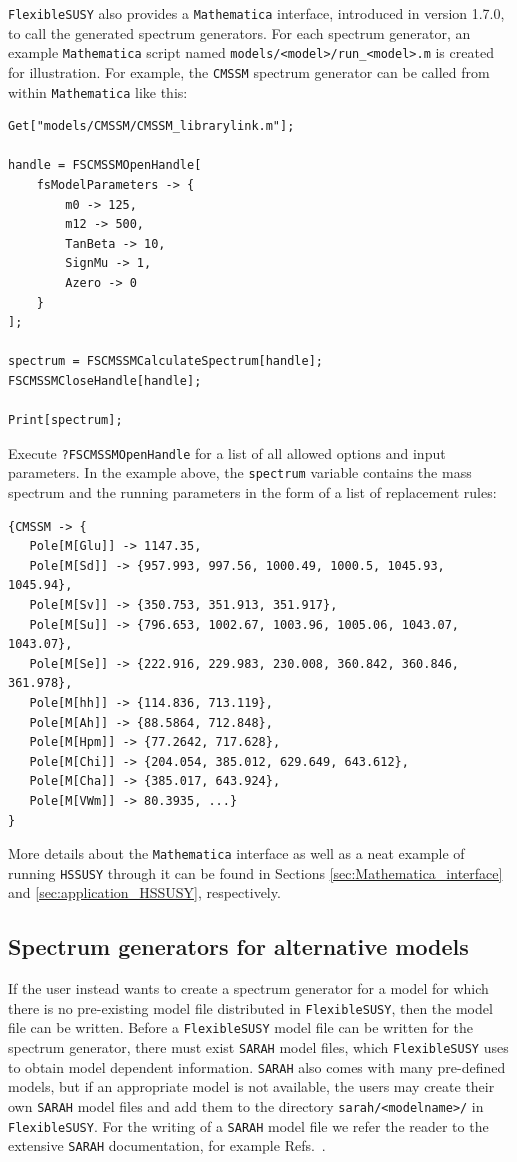 \documentclass[final,3p,11pt,pdflatex]{elsarticle}
\makeatletter
\newcommand{\modelname}[1]{\texttt{#1}\@\xspace}
\newcommand{\sarah}{\texttt{SARAH}\@\xspace}
\newcommand{\fs}{\texttt{FlexibleSUSY}\@\xspace}
\newcommand{\HSSUSY}{\modelname{HSSUSY}}
\newcommand{\mathematica}{\texttt{Ma\-the\-ma\-ti\-ca}\xspace}
\newcommand{\code}[1]{\lstinline|#1|}  %
\makeatother
\begin{document}
\fs also provides a \mathematica interface, introduced in version 1.7.0,
to call the generated spectrum generators.  For each spectrum
generator, an example \mathematica script named
\code{models/<model>/run_<model>.m} is created for illustration.  For
example, the \modelname{CMSSM} spectrum generator can be called from within
\mathematica like this:
%
\begin{lstlisting}
Get["models/CMSSM/CMSSM_librarylink.m"];

handle = FSCMSSMOpenHandle[
    fsModelParameters -> {
        m0 -> 125,
        m12 -> 500,
        TanBeta -> 10,
        SignMu -> 1,
        Azero -> 0
    }
];

spectrum = FSCMSSMCalculateSpectrum[handle];
FSCMSSMCloseHandle[handle];

Print[spectrum];
\end{lstlisting}
%
Execute \code{?FSCMSSMOpenHandle} for a list of all allowed options and
input parameters.  In the example above, the \code{spectrum} variable
contains the mass spectrum and the running parameters in the form of a
list of replacement rules:
%
\begin{lstlisting}
{CMSSM -> {
   Pole[M[Glu]] -> 1147.35,
   Pole[M[Sd]] -> {957.993, 997.56, 1000.49, 1000.5, 1045.93, 1045.94},
   Pole[M[Sv]] -> {350.753, 351.913, 351.917},
   Pole[M[Su]] -> {796.653, 1002.67, 1003.96, 1005.06, 1043.07, 1043.07},
   Pole[M[Se]] -> {222.916, 229.983, 230.008, 360.842, 360.846, 361.978},
   Pole[M[hh]] -> {114.836, 713.119},
   Pole[M[Ah]] -> {88.5864, 712.848},
   Pole[M[Hpm]] -> {77.2642, 717.628},
   Pole[M[Chi]] -> {204.054, 385.012, 629.649, 643.612},
   Pole[M[Cha]] -> {385.017, 643.924},
   Pole[M[VWm]] -> 80.3935, ...}
}
\end{lstlisting}
%
More details about the \mathematica interface as well as a neat
example of running \HSSUSY through it can be found in Sections
\ref{sec:Mathematica_interface} and \ref{sec:application_HSSUSY},
respectively.

\subsection{Spectrum generators for alternative models}
\label{sec:quick-start-alternative-models}
If the user instead wants to create a spectrum generator for a model
for which there is no pre-existing model file distributed in
\fs, then the model file can be written. Before a \fs
model file can be written for the spectrum generator, there must exist
\sarah model files, which \fs uses to obtain model dependent
information. \sarah also comes with many pre-defined models, but if an
appropriate model is not available, the users may create their own
\sarah model files and add them to the directory
\code{sarah/<modelname>/} in \fs.  For the writing of a \sarah model
file we refer the reader to the extensive \sarah documentation, for
example Refs.\
\cite{Staub:2017jnp,Staub:2009bi,Staub:2010jh,Staub:2012pb,
  Staub:2013tta,Athron:2014yba}.
\end{document}
